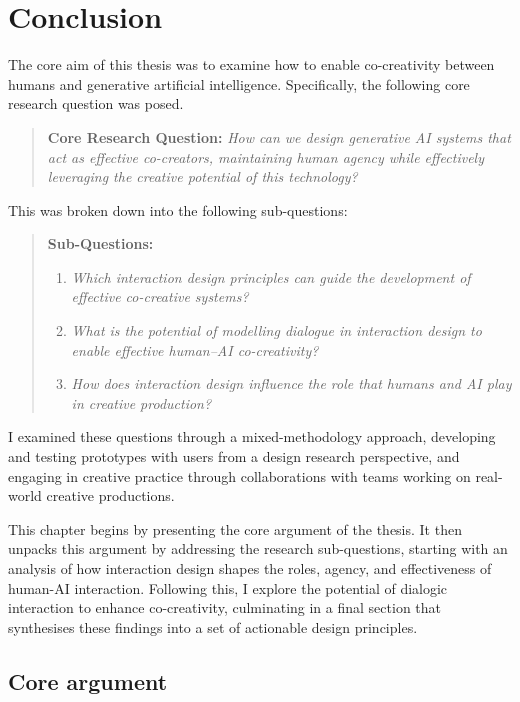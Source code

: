 \chapter[Conclusion]{Conclusion}\label{c:conclusion}

The core aim of this thesis was to examine how to enable co-creativity between humans and generative artificial intelligence. Specifically, the following core research question was posed.

\begin{quote}
\textbf{Core Research Question:}
\emph{How can we design generative AI systems that act as effective co-creators, maintaining human agency while effectively leveraging the creative potential of this technology?}
\end{quote}

This was broken down into the following sub-questions:

\begin{quote}
\textbf{Sub-Questions:}
\begin{enumerate}
    \item \emph{Which interaction design principles can guide the development of effective co-creative systems?}
    \item \emph{What is the potential of modelling dialogue in interaction design to enable effective human--AI co-creativity?}
    \item \emph{How does interaction design influence the role that humans and AI play in creative production?}
\end{enumerate}
\end{quote}

I examined these questions through a mixed-methodology approach, developing and testing prototypes with users from a design research perspective, and engaging in creative practice through collaborations with teams working on real-world creative productions.

This chapter begins by presenting the core argument of the thesis. It then unpacks this argument by addressing the research sub-questions, starting with an analysis of how interaction design shapes the roles, agency, and effectiveness of human-AI interaction. Following this, I explore the potential of dialogic interaction to enhance co-creativity, culminating in a final section that synthesises these findings into a set of actionable design principles.

\section{Core argument}

